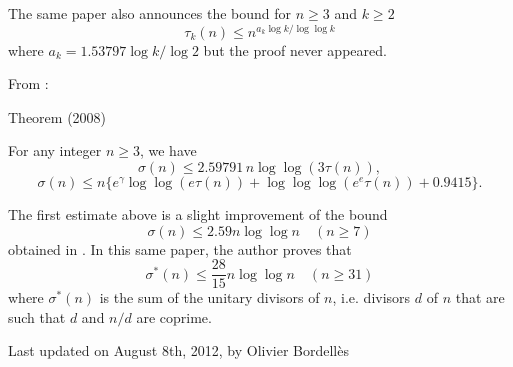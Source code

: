 The same paper also announces the bound for $n\ge3$ and $k\ge2$
$$
\tau_k(n)\le n^{a_k\log k/\log\log k}
$$
where $a_k=1.53797\log k / \log 2$ but the proof never appeared.

From \cite{Nicolas*08}:

\begin{thm}{Theorem (2008)}

For any integer $n\ge3$, we have
  $$\sigma(n)\le 2.59791\, n\log\log(3\tau(n)),$$
  $$\sigma(n)\le n\{ e^\gamma\log\log(e\tau(n))+\log\log\log(e^e\tau(n))+0.9415\}.$$
\end{thm}


The first estimate above is a slight improvement of the bound
  $$\sigma(n)\le 2.59 n\log\log n\quad(n\ge7)$$
obtained in
\cite{Ivic*77}. In this same paper,
  the author proves that
$$\sigma^*(n)\le \frac{28}{15} n\log\log n\quad(n\ge31)$$
where $\sigma^*(n)$ is the sum of the unitary divisors of $n$, i.e. divisors
  $d$ of $n$ that are such that $d$ and $n/d$ are coprime.







  
  Last updated on August 8th, 2012, by Olivier Bordell\`es















